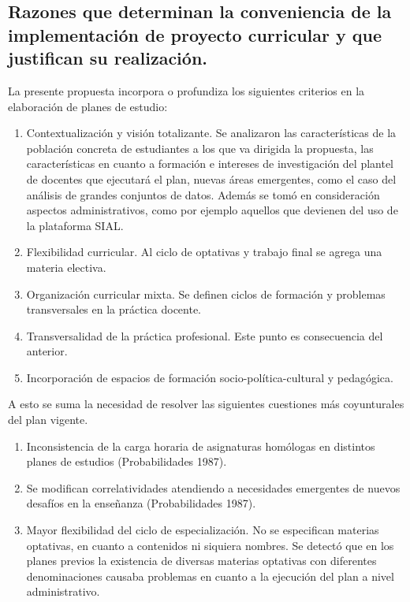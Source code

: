 \documentclass[a4paper, 12pt]{article}
\begin{document}
\subsection{Razones que determinan la conveniencia de la implementación de proyecto curricular  y que justifican su realización.}

La presente propuesta incorpora o profundiza los siguientes criterios en la elaboración de planes de estudio: 

\begin{enumerate}
\item Contextualización y visión totalizante. Se analizaron las características de la población concreta de estudiantes a los que va dirigida la propuesta, las características en cuanto a formación e intereses de investigación del plantel de docentes que ejecutará el plan, nuevas áreas emergentes, como el caso del análisis de grandes conjuntos de datos. Además se tomó en consideración aspectos administrativos, como por ejemplo aquellos que devienen del uso de la plataforma SIAL. 
\item Flexibilidad curricular. Al ciclo de optativas y trabajo final se agrega una materia electiva.
\item Organización curricular mixta. Se definen ciclos de formación y problemas transversales en la práctica docente. 
\item Transversalidad de la práctica profesional. Este punto es consecuencia del anterior.
\item Incorporación de espacios de formación socio-política-cultural y pedagógica.
\end{enumerate}

A esto se suma la necesidad de resolver las siguientes cuestiones más coyunturales del plan vigente.

\begin{enumerate}
\item Inconsistencia de la carga horaria de asignaturas homólogas en distintos planes de estudios (Probabilidades 1987).

\item Se modifican correlatividades atendiendo a necesidades emergentes de nuevos desafíos en la enseñanza (Probabilidades 1987). 

\item Mayor flexibilidad del ciclo de especialización. No se especifican materias optativas, en cuanto a contenidos ni siquiera nombres. Se detectó que en los planes previos la existencia de diversas materias optativas con diferentes denominaciones causaba problemas en cuanto a la ejecución del plan a nivel administrativo.  
\end{enumerate}
\end{document}
